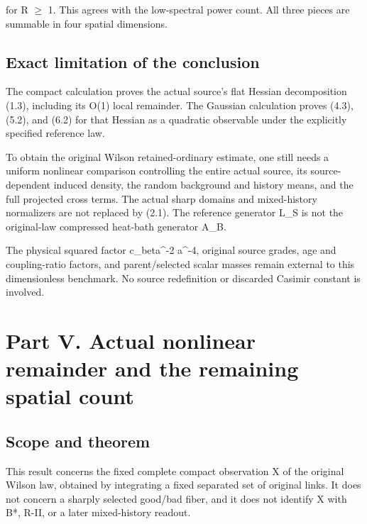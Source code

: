 \documentclass[
  11pt,
]{article}
\begin{document}
for R \(\geq\) 1. This agrees with the low-spectral power count. All
three pieces are summable in four spatial dimensions.

\hypertarget{exact-limitation-of-the-conclusion}{%
\subsection{Exact limitation of the
conclusion}\label{exact-limitation-of-the-conclusion}}

The compact calculation proves the actual source's flat Hessian
decomposition (1.3), including its O(1) local remainder. The Gaussian
calculation proves (4.3), (5.2), and (6.2) for that Hessian as a
quadratic observable under the explicitly specified reference law.

To obtain the original Wilson retained-ordinary estimate, one still
needs a uniform nonlinear comparison controlling the entire actual
source, its source-dependent induced density, the random background and
history means, and the full projected cross terms. The actual sharp
domains and mixed-history normalizers are not replaced by (2.1). The
reference generator L\_S is not the original-law compressed heat-bath
generator A\_B.

The physical squared factor c\_beta\^{}-2 a\^{}-4, original source
grades, age and coupling-ratio factors, and parent/selected scalar
masses remain external to this dimensionless benchmark. No source
redefinition or discarded Casimir constant is involved.

\newpage

\hypertarget{part-v.-actual-nonlinear-remainder-and-the-remaining-spatial-count}{%
\section{Part V. Actual nonlinear remainder and the remaining spatial
count}\label{part-v.-actual-nonlinear-remainder-and-the-remaining-spatial-count}}

\hypertarget{scope-and-theorem}{%
\subsection{Scope and theorem}\label{scope-and-theorem}}

This result concerns the fixed complete compact observation X of the
original Wilson law, obtained by integrating a fixed separated set of
original links. It does not concern a sharply selected good/bad fiber,
and it does not identify X with B*, R-II, or a later mixed-history
readout.
\end{document}

